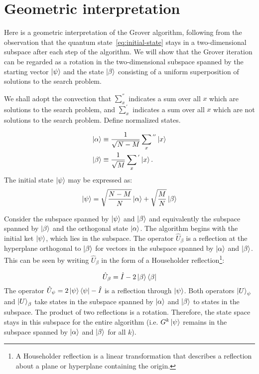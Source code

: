 \section{Geometric interpretation}\label{sec:geometric-interpretation}
Here is a geometric interpretation of the Grover algorithm, following from the observation that the quantum state~\ref{eq:initial-state} stays in a two-dimensional subspace after each step of the algorithm. We will show that the Grover iteration can be regarded as a rotation in the two-dimensional subspace spanned by the starting vector $\ket{\psi}$ and the state $\ket{\beta}$ consisting of a uniform superposition of solutions to the search problem. 

We shall adopt the convection that $\sum_{x}^{''}$ indicates a sum over all $x$ which are solutions to the search problem, and $\sum_{x}^{'}$ indicates a sum over all $x$ which are not solutions to the search problem. Define normalized states.

\begin{equation*}
\begin{split}
 \ket{\alpha} &\equiv \frac{1}{\sqrt{N-M}} \sum_{x}{}^{''} \ket{x} \\
 \ket{\beta} &\equiv \frac{1}{\sqrt{M}} \sum_{x}{}^{'} \ket{x}.
\end{split}
\end{equation*}
The initial state $\ket{\psi}$ may be expressed as:
\begin{equation*}
    \ket{\psi} = \sqrt{\frac{N-M}{N}} \ket{\alpha} + \sqrt{\frac{M}{N}} \ket{\beta}
\end{equation*}

Consider the subspace spanned by $\ket{\psi}$ and $\ket{\beta}$ and equivalently the subspace spanned by $\ket{\beta}$ and the orthogonal state $\ket{\alpha}$.
The algorithm begins with the initial ket $\ket{\psi}$, which lies in the subspace. The operator $\hat{U}_\beta$ is a reflection at the hyperplane orthogonal to $\ket{\beta}$ for vectors in the subspace spanned by $\ket{\alpha}$ and $\ket{\beta}$. This can be seen by writing $\hat{U}_\beta$ in the form of a Householder reflection\footnote{A Householder reflection is a linear transformation that describes a reflection about a plane or hyperplane containing the origin.}:

\begin{equation}
    \hat{U}_\beta = \hat{I} - 2 \ket{\beta}\bra{\beta}
\end{equation}
 The operator $\hat{U}_\psi = 2 \ket{\psi}\bra{\psi} - \hat{I}$ is a reflection through $\ket{\psi}$. Both operators $\ket{U}_\psi$ and $\ket{U}_\beta$ take states in the subspace spanned by $\ket{\alpha}$ and $\ket{\beta}$ to states in the subspace. The product of two reflections is a rotation. Therefore, the state space stays in this subspace for the entire algorithm (i.e. $G^k\ket{\psi}$ remains in the subspace spanned by $\ket{\alpha}$ and $\ket{\beta}$ for all $k$). 
 
